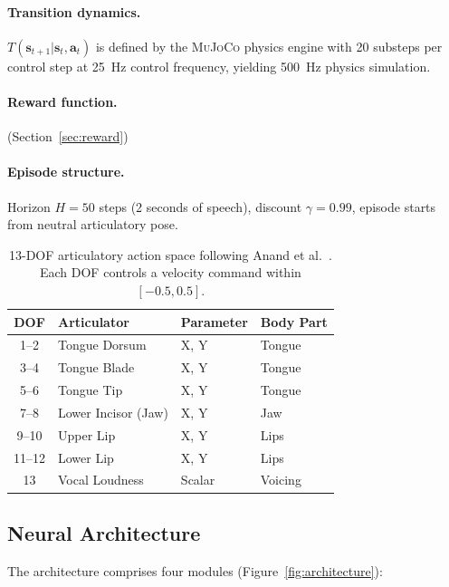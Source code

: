 \documentclass[11pt, a4paper]{article}
\newcommand{\mujoco}{\textsc{MuJoCo}}
\begin{document}
\paragraph{Transition dynamics.} $T(\mathbf{s}_{t+1} | \mathbf{s}_t, \mathbf{a}_t)$ is defined by the \mujoco{} physics engine with 20 substeps per control step at 25~Hz control frequency, yielding 500~Hz physics simulation.

\paragraph{Reward function.} (Section~\ref{sec:reward})

\paragraph{Episode structure.} Horizon $H = 50$ steps (2 seconds of speech), discount $\gamma = 0.99$, episode starts from neutral articulatory pose.

\begin{table}[t]
\centering
\caption{13-DOF articulatory action space following Anand et al.~\cite{anand2025articulatory}. Each DOF controls a velocity command within $[-0.5, 0.5]$.}
\label{tab:dof}
\small
\begin{tabular}{clll}
\toprule
DOF & Articulator & Parameter & Body Part \\
\midrule
1--2 & Tongue Dorsum & X, Y & Tongue \\
3--4 & Tongue Blade & X, Y & Tongue \\
5--6 & Tongue Tip & X, Y & Tongue \\
7--8 & Lower Incisor (Jaw) & X, Y & Jaw \\
9--10 & Upper Lip & X, Y & Lips \\
11--12 & Lower Lip & X, Y & Lips \\
13 & Vocal Loudness & Scalar & Voicing \\
\bottomrule
\end{tabular}
\end{table}

\subsection{Neural Architecture}
\label{sec:architecture}

The architecture comprises four modules (Figure~\ref{fig:architecture}):
\end{document}
